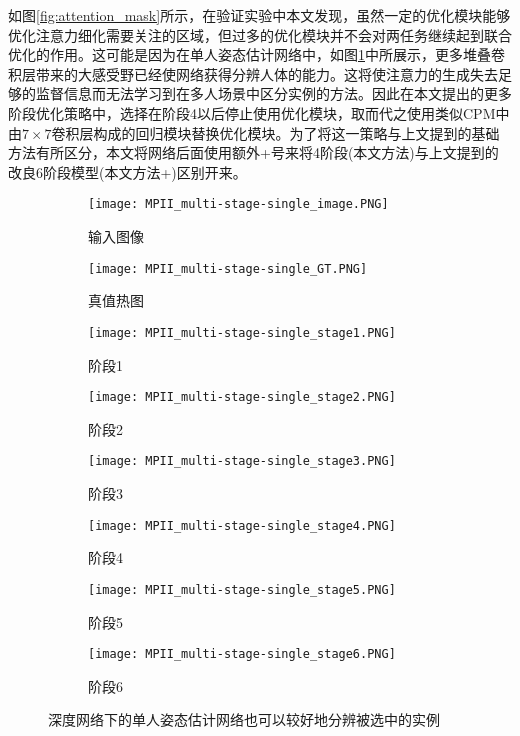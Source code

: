 如图\ref{fig:attention_mask}所示，在验证实验中本文发现，虽然一定的优化模块能够优化注意力细化需要关注的区域，但过多的优化模块并不会对两任务继续起到联合优化的作用。这可能是因为在单人姿态估计网络中，如图\ref{fig:singleposemultistage}中所展示，更多堆叠卷积层带来的大感受野已经使网络获得分辨人体的能力。这将使注意力的生成失去足够的监督信息而无法学习到在多人场景中区分实例的方法。因此在本文提出的更多阶段优化策略中，选择在阶段4以后停止使用优化模块，取而代之使用类似CPM\cite{wei2016convolutional}中由$7\times7$卷积层构成的回归模块替换优化模块。为了将这一策略与上文提到的基础方法有所区分，本文将网络后面使用额外+号来将4阶段(本文方法)与上文提到的改良6阶段模型(本文方法+)区别开来。

\begin{figure}[h]
\centering
\begin{subfigure}[b]{0.2\linewidth}
	\texttt{[image: MPII\_multi-stage-single\_image.PNG]}
	\caption{输入图像}
\end{subfigure}
\begin{subfigure}[b]{0.2\linewidth}
	\texttt{[image: MPII\_multi-stage-single\_GT.PNG]}
	\caption{真值热图}
\end{subfigure}
\begin{subfigure}[b]{0.2\linewidth}
	\texttt{[image: MPII\_multi-stage-single\_stage1.PNG]}
	\caption{阶段1}
\end{subfigure}
\begin{subfigure}[b]{0.2\linewidth}
	\texttt{[image: MPII\_multi-stage-single\_stage2.PNG]}
	\caption{阶段2}
\end{subfigure}

\begin{subfigure}[b]{0.2\linewidth}
	\texttt{[image: MPII\_multi-stage-single\_stage3.PNG]}
	\caption{阶段3}
\end{subfigure}
\begin{subfigure}[b]{0.2\linewidth}
	\texttt{[image: MPII\_multi-stage-single\_stage4.PNG]}
	\caption{阶段4}
\end{subfigure}
\begin{subfigure}[b]{0.2\linewidth}
	\texttt{[image: MPII\_multi-stage-single\_stage5.PNG]}
	\caption{阶段5}
\end{subfigure}
\begin{subfigure}[b]{0.2\linewidth}
	\texttt{[image: MPII\_multi-stage-single\_stage6.PNG]}
	\caption{阶段6}
\end{subfigure}
\caption{深度网络下的单人姿态估计网络也可以较好地分辨被选中的实例}
\label{fig:singleposemultistage}
\end{figure}

